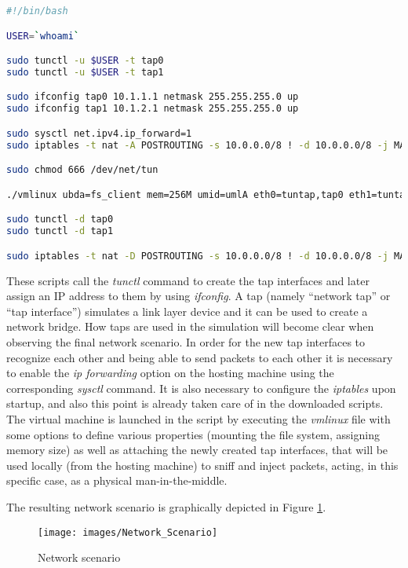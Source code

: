 \begin{lstlisting}[language=bash, caption=\textit{client.sh}, label=clientconf]
#!/bin/bash

USER=`whoami`

sudo tunctl -u $USER -t tap0
sudo tunctl -u $USER -t tap1

sudo ifconfig tap0 10.1.1.1 netmask 255.255.255.0 up
sudo ifconfig tap1 10.1.2.1 netmask 255.255.255.0 up

sudo sysctl net.ipv4.ip_forward=1
sudo iptables -t nat -A POSTROUTING -s 10.0.0.0/8 ! -d 10.0.0.0/8 -j MASQUERADE

sudo chmod 666 /dev/net/tun

./vmlinux ubda=fs_client mem=256M umid=umlA eth0=tuntap,tap0 eth1=tuntap,tap1

sudo tunctl -d tap0
sudo tunctl -d tap1

sudo iptables -t nat -D POSTROUTING -s 10.0.0.0/8 ! -d 10.0.0.0/8 -j MASQUERADE
\end{lstlisting}

These scripts call the \textit{tunctl} command to create the tap interfaces and later assign an IP address to them by using \textit{ifconfig}. A tap (namely ``network tap'' or ``tap interface'') simulates a link layer device and it can be used to create a network bridge. How taps are used in the simulation will become clear when observing the final network scenario.
In order for the new tap interfaces to recognize each other and being able to send packets to each other it is necessary to enable the \textit{ip forwarding} option on the hosting machine using the corresponding \textit{sysctl} command. It is also necessary to configure the \textit{iptables} upon startup, and also this point is already taken care of in the downloaded scripts. The virtual machine is launched in the script by executing the \textit{vmlinux} file with some options to define various properties (mounting the file system, assigning memory size) as well as attaching the newly created tap interfaces, that will be used locally (from the hosting machine) to sniff and inject packets, acting, in this specific case, as a physical man-in-the-middle.

The resulting network scenario is graphically depicted in Figure \ref{fig:networkscenario}.

\begin{figure}[!htb]
\centering
\texttt{[image: images/Network\_Scenario]}
\caption{Network scenario}
\label{fig:networkscenario}
\end{figure}

